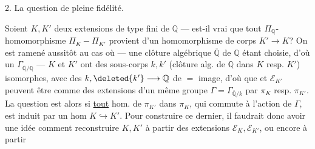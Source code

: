 2. La question de pleine fidélité.

Soient $K,K'$ deux extensions de type fini de $\mathbb Q$ --- est-il vrai que tout $\Pi_{\mathbb Q}$-homomorphisme $\Pi_K-\Pi_{K'}$ provient d'un homomorphisme de corps $K'\longrightarrow K$? On est ramené aussitôt au cas où --- une clôture algébrique $\overline{\mathbb Q}$ de $\mathbb Q$ étant choisie, d'où un $\Gamma_{\overline{\mathbb Q}/\mathbb Q}$ --- $K$ et $K'$ ont des sous-corps $k,k'$ (clôture alg. de $\mathbb Q$ dans $K$ resp. $K'$) isomorphes, avec des   $k,\deleted{k'}\longrightarrow\mathbb Q$ de $=$ image, d'où que  et $\mathcal E_{K'}$ peuvent être  comme des extensions d'un même groupe $\Gamma=\Gamma_{\overline{\mathbb Q}/k}$ par $\pi_K$ resp. $\pi_{K'}$. La question est alors si \uline{tout} hom. de $\pi_{K'}$ dans $\pi_K$, qui commute à l'action de $\Gamma$, est induit par un hom $K\hookrightarrow K'$. Pour construire ce dernier, il faudrait donc avoir une idée comment reconstruire $K,K'$ à partir des extensions $\mathcal E_K,\mathcal E_{K'}$, ou encore à partir
